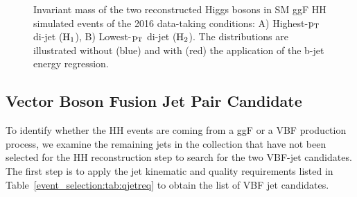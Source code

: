 \begin{figure}[htp!]
\centering
\captionsetup[subfigure]{justification=centering}
\caption[Invariant mass of the two reconstructed Higgs bosons in SM ggF HH simulated events]{Invariant mass of the two reconstructed Higgs bosons in SM ggF HH simulated events of the 2016 data-taking conditions: A) Highest-$\mathrm{p_{T}}$ di-jet ($\mathrm{H_{1}}$), B) Lowest-$\mathrm{p_{T}}$ di-jet ($\mathrm{H_{2}}$). The distributions are illustrated without (blue) and with (red) the application of the b-jet energy regression.}
\label{fig:bjetreg}
\end{figure}

\subsection{Vector Boson Fusion Jet Pair Candidate} \label{subsec:vbfpair}

To identify whether the HH events are coming from a ggF or a VBF production process, we examine the remaining jets in the collection that have not been selected for the HH reconstruction step to search for the two VBF-jet candidates. The first step is to apply the jet kinematic and quality requirements listed in Table~\ref{event_selection:tab:qjetreq} to obtain the list of VBF jet candidates.

